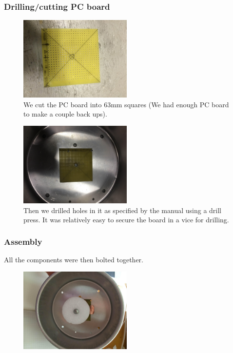 \documentclass[11pt]{article} %
\begin{document}
\subsubsection{Drilling/cutting PC board}

\begin{figure}
  \centering
  \caption{  We cut the PC board into 63mm squares (We had enough PC board to make a couple back ups).  }
  \includegraphics[width=0.50\textwidth]{feed/15.jpeg}
\end{figure}


\begin{figure}
  \centering
  \caption{  Then we drilled holes in it as specified by the manual using a drill press. It was relatively easy to secure the board in a vice for drilling.  }
  \includegraphics[width=0.50\textwidth]{feed/16.jpeg}
\end{figure}




\subsubsection{Assembly}
All the components were then bolted together. 


\begin{figure}
  \centering
  \caption{   }
  \includegraphics[width=0.50\textwidth]{feed/17.jpeg}
\end{figure}
\end{document}
